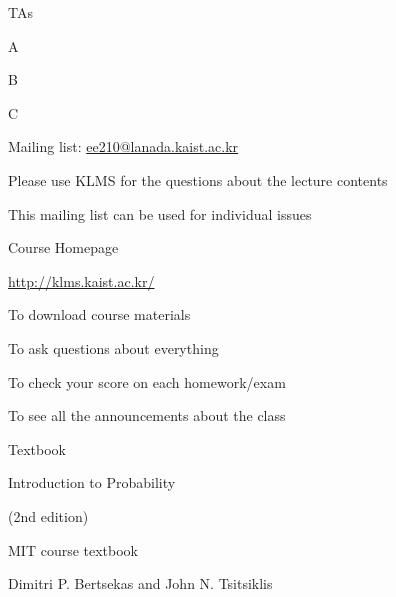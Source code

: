 \documentclass[fleqn,aspectratio=169]{beamer}
\begin{document}
\begin{frame}{TAs}

\bci
\item A
\item B
\item C

\bigskip
\item Mailing list: \url{ee210@lanada.kaist.ac.kr}

\bci
\item Please use KLMS for the questions about the lecture contents
\item This mailing list can be used for individual issues
\eci

\eci

\end{frame}


\begin{frame}{Course Homepage}


\plitemsep 0.2in

\bci 
\item \url{http://klms.kaist.ac.kr/}
\item To download course materials
\item To ask questions about everything
\item To check your score on each homework/exam
\item To see all the announcements about the class
\eci

\end{frame}

\begin{frame}{Textbook}


{
\bci 
\item Introduction to Probability 

(2nd edition)

\bci
\item MIT course textbook
\item Dimitri P. Bertsekas and John N. Tsitsiklis
\eci
\eci
}
{
\centering
{}
}


\end{frame}
\end{document}
